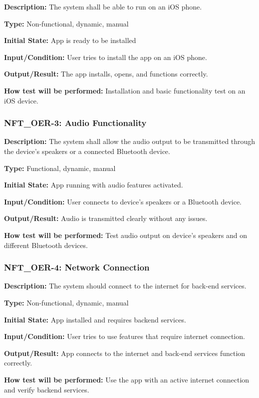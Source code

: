 \documentclass[12pt, titlepage]{article}
\begin{document}
\textbf{Description: }The system shall be able to run on an iOS phone.

\textbf{Type:} Non-functional, dynamic, manual

\textbf{Initial State:} App is ready to be installed

\textbf{Input/Condition:} User tries to install the app on an iOS phone.

\textbf{Output/Result:} The app installs, opens, and functions correctly.

\textbf{How test will be performed:} Installation and basic functionality test on an iOS device.


\subsubsection*{\textbf{NFT\_OER-3: Audio Functionality }
}

\textbf{Description: }The system shall allow the audio output to be transmitted through the device’s speakers or a connected Bluetooth device.

\textbf{Type:} Functional, dynamic, manual

\textbf{Initial State:} App running with audio features activated.

\textbf{Input/Condition: }User connects to device’s speakers or a Bluetooth device.

\textbf{Output/Result:} Audio is transmitted clearly without any issues.

\textbf{How test will be performed: }Test audio output on device’s speakers and on different Bluetooth devices.


\subsubsection*{\textbf{NFT\_OER-4: Network Connection}
}

\textbf{Description: }The system should connect to the internet for back-end services.

\textbf{Type: }Non-functional, dynamic, manual

\textbf{Initial State: }App installed and requires backend services.

\textbf{Input/Condition: }User tries to use features that require internet connection.

\textbf{Output/Result:} App connects to the internet and back-end services function correctly.

\textbf{How test will be performed:} Use the app with an active internet connection and verify backend services.
\newline
\end{document}

